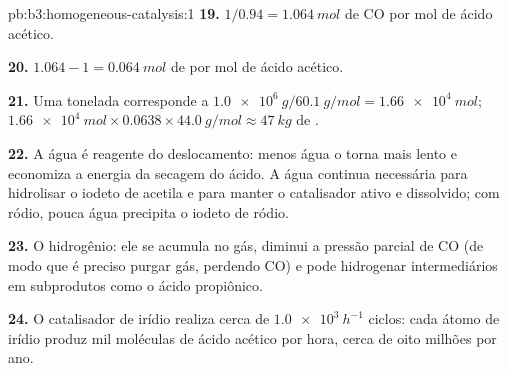 \begin{solution}{pb:b3:homogeneous-catalysis:1}
\textbf{19.} $1/0.94 = \qty{1.064}{mol}$ de CO por mol de ácido acético.

\textbf{20.} $1.064 - 1 = \qty{0.064}{mol}$ de  por mol de ácido acético.

\textbf{21.} Uma tonelada corresponde a $\qty{1.0e6}{g}/\qty{60.1}{g/mol} = \qty{1.66e4}{mol}$; $\qty{1.66e4}{mol} \times 0.0638 \times \qty{44.0}{g/mol} \approx \qty{47}{kg}$ de .

\textbf{22.} A água é reagente do deslocamento: menos água o torna mais lento e economiza a energia
da secagem do ácido. A água continua necessária para hidrolisar o iodeto de acetila e para manter o
catalisador ativo e dissolvido; com ródio, pouca água precipita o iodeto de
ródio.

\textbf{23.} O hidrogênio: ele se acumula no gás, diminui a pressão parcial de CO
(de modo que é preciso purgar gás, perdendo CO) e pode hidrogenar intermediários em
subprodutos como o ácido propiônico.

\textbf{24.} O catalisador de irídio realiza cerca de $\qty{1.0e3}{h^{-1}}$ ciclos: cada átomo de irídio produz
mil moléculas de ácido acético por hora, cerca de oito milhões por ano.
\end{solution}
